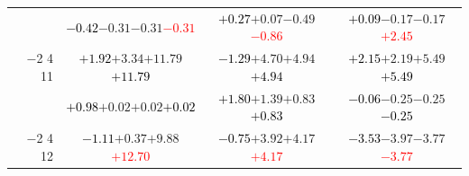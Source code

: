 \documentclass[compress]{beamer}
\begin{document}
\begin{frame}
\begin{tabular}{r | c | c | c}
          & \textcolor{black}{$-0.42$}\hspace{0.1 cm}$-0.31$\hspace{0.1 cm}$-0.31$\hspace{0.1 cm}\textcolor{red}{$-0.31$} & \textcolor{black}{$+0.27$}\hspace{0.1 cm}$+0.07$\hspace{0.1 cm}$-0.49$\hspace{0.1 cm}\textcolor{red}{$-0.86$} & \textcolor{black}{$+0.09$}\hspace{0.1 cm}$-0.17$\hspace{0.1 cm}$-0.17$\hspace{0.1 cm}\textcolor{red}{$+2.45$} \\
$-$2 4 11 & \textcolor{black}{$+1.92$}\hspace{0.1 cm}$+3.34$\hspace{0.1 cm}$+11.79$\hspace{0.1 cm}\textcolor{black}{$+11.79$} & \textcolor{black}{$-1.29$}\hspace{0.1 cm}$+4.70$\hspace{0.1 cm}$+4.94$\hspace{0.1 cm}\textcolor{black}{$+4.94$} & \textcolor{black}{$+2.15$}\hspace{0.1 cm}$+2.19$\hspace{0.1 cm}$+5.49$\hspace{0.1 cm}\textcolor{black}{$+5.49$} \\
          & \textcolor{black}{$+0.98$}\hspace{0.1 cm}$+0.02$\hspace{0.1 cm}$+0.02$\hspace{0.1 cm}\textcolor{black}{$+0.02$} & \textcolor{black}{$+1.80$}\hspace{0.1 cm}$+1.39$\hspace{0.1 cm}$+0.83$\hspace{0.1 cm}\textcolor{black}{$+0.83$} & \textcolor{black}{$-0.06$}\hspace{0.1 cm}$-0.25$\hspace{0.1 cm}$-0.25$\hspace{0.1 cm}\textcolor{black}{$-0.25$} \\
$-$2 4 12 & \textcolor{black}{$-1.11$}\hspace{0.1 cm}$+0.37$\hspace{0.1 cm}$+9.88$\hspace{0.1 cm}\textcolor{red}{$+12.70$} & \textcolor{black}{$-0.75$}\hspace{0.1 cm}$+3.92$\hspace{0.1 cm}$+4.17$\hspace{0.1 cm}\textcolor{red}{$+4.17$} & \textcolor{black}{$-3.53$}\hspace{0.1 cm}$-3.97$\hspace{0.1 cm}$-3.77$\hspace{0.1 cm}\textcolor{red}{$-3.77$} \\

\end{tabular}
\end{frame}
\end{document}
